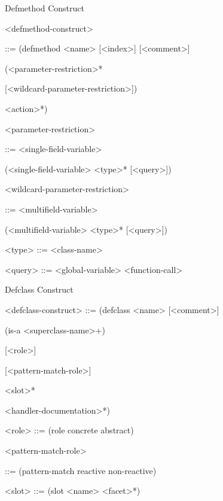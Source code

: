 \documentclass[letterpaper,10pt,english]{sphinxmanual}
\begin{document}
Defmethod Construct

\textless{}defmethod-construct\textgreater{}

::= (defmethod \textless{}name\textgreater{} {[}\textless{}index\textgreater{}{]} {[}\textless{}comment\textgreater{}{]}

(\textless{}parameter-restriction\textgreater{}*

{[}\textless{}wildcard-parameter-restriction\textgreater{}{]})

\textless{}action\textgreater{}*)

\textless{}parameter-restriction\textgreater{}

::= \textless{}single-field-variable\textgreater{} \textbar{}

(\textless{}single-field-variable\textgreater{} \textless{}type\textgreater{}* {[}\textless{}query\textgreater{}{]})

\textless{}wildcard-parameter-restriction\textgreater{}

::= \textless{}multifield-variable\textgreater{} \textbar{}

(\textless{}multifield-variable\textgreater{} \textless{}type\textgreater{}* {[}\textless{}query\textgreater{}{]})

\textless{}type\textgreater{} ::= \textless{}class-name\textgreater{}

\textless{}query\textgreater{} ::= \textless{}global-variable\textgreater{} \textbar{} \textless{}function-call\textgreater{}

Defclass Construct

\textless{}defclass-construct\textgreater{} ::= (defclass \textless{}name\textgreater{} {[}\textless{}comment\textgreater{}{]}

(is-a \textless{}superclass-name\textgreater{}+)

{[}\textless{}role\textgreater{}{]}

{[}\textless{}pattern-match-role\textgreater{}{]}

\textless{}slot\textgreater{}*

\textless{}handler-documentation\textgreater{}*)

\textless{}role\textgreater{} ::= (role concrete \textbar{} abstract)

\textless{}pattern-match-role\textgreater{}

::= (pattern-match reactive \textbar{} non-reactive)

\textless{}slot\textgreater{} ::= (slot \textless{}name\textgreater{} \textless{}facet\textgreater{}*) \textbar{}
\end{document}

